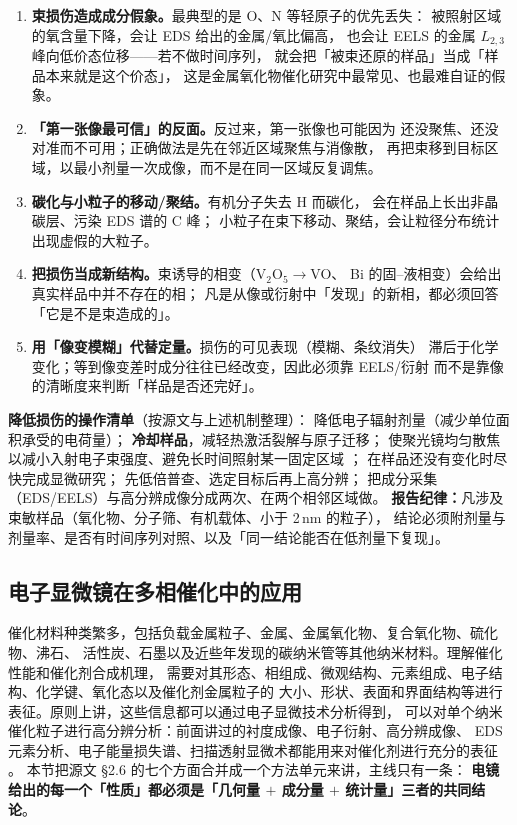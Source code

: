 \begin{pitfall}
\begin{enumerate}[leftmargin=1.6em]
\item \textbf{束损伤造成成分假象。}最典型的是 O、N 等轻原子的优先丢失：
被照射区域的氧含量下降，会让 EDS 给出的金属/氧比偏高，
也会让 EELS 的金属 $L_{2,3}$ 峰向低价态位移——若不做时间序列，
就会把「被束还原的样品」当成「样品本来就是这个价态」，
这是金属氧化物催化研究中最常见、也最难自证的假象。
\item \textbf{「第一张像最可信」的反面。}反过来，第一张像也可能因为
还没聚焦、还没对准而不可用；正确做法是先在邻近区域聚焦与消像散，
再把束移到目标区域，以最小剂量一次成像，而不是在同一区域反复调焦。
\item \textbf{碳化与小粒子的移动/聚结。}有机分子失去 H 而碳化，
会在样品上长出非晶碳层、污染 EDS 谱的 C 峰；
小粒子在束下移动、聚结，会让粒径分布统计出现虚假的大粒子。
\item \textbf{把损伤当成新结构。}束诱导的相变（V$_2$O$_5\rightarrow$VO、
Bi 的固--液相变）会给出真实样品中并不存在的相；
凡是从像或衍射中「发现」的新相，都必须回答「它是不是束造成的」。
\item \textbf{用「像变模糊」代替定量。}损伤的可见表现（模糊、条纹消失）
滞后于化学变化；等到像变差时成分往往已经改变，因此必须靠 EELS/衍射
而不是靠像的清晰度来判断「样品是否还完好」。
\end{enumerate}
\end{pitfall}

\begin{crosscheck}
\textbf{降低损伤的操作清单}（按源文与上述机制整理）：
降低电子辐射剂量（减少单位面积承受的电荷量）；
\textbf{冷却样品}，减轻热激活裂解与原子迁移；
使聚光镜均匀散焦以减小入射电子束强度、避免长时间照射某一固定区域
；
在样品还没有变化时尽快完成显微研究；
先低倍普查、选定目标后再上高分辨；
把成分采集（EDS/EELS）与高分辨成像分成两次、在两个相邻区域做。
\textbf{报告纪律：}凡涉及束敏样品（氧化物、分子筛、有机载体、小于 2\,nm 的粒子），
结论必须附剂量与剂量率、是否有时间序列对照、以及「同一结论能否在低剂量下复现」。
\end{crosscheck}
\subsection{电子显微镜在多相催化中的应用}

催化材料种类繁多，包括负载金属粒子、金属、金属氧化物、复合氧化物、硫化物、沸石、
活性炭、石墨以及近些年发现的碳纳米管等其他纳米材料。理解催化性能和催化剂合成机理，
需要对其形态、相组成、微观结构、元素组成、电子结构、化学键、氧化态以及催化剂金属粒子的
大小、形状、表面和界面结构等进行表征。原则上讲，这些信息都可以通过电子显微技术分析得到，
可以对单个纳米催化粒子进行高分辨分析：前面讲过的衬度成像、电子衍射、高分辨成像、
EDS 元素分析、电子能量损失谱、扫描透射显微术都能用来对催化剂进行充分的表征
。
本节把源文 §2.6 的七个方面合并成一个方法单元来讲，主线只有一条：
\textbf{电镜给出的每一个「性质」都必须是「几何量 $+$ 成分量 $+$ 统计量」三者的共同结论}。

